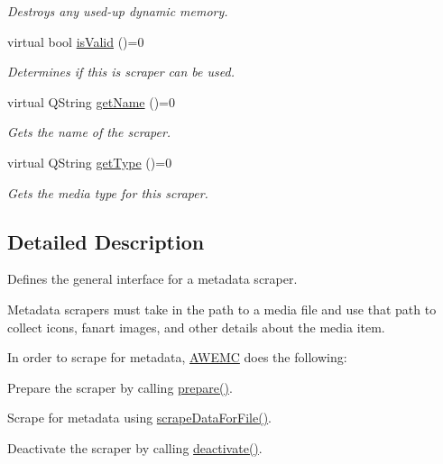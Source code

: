 \begin{DoxyCompactItemize}
\begin{DoxyCompactList}\small\item\em Destroys any used-\/up dynamic memory. \end{DoxyCompactList}\item 
virtual bool \hyperlink{class_a_w_e_1_1_metadata_scraper_a06f9da8e43ac52378ec15fc849e42eb8}{is\-Valid} ()=0
\begin{DoxyCompactList}\small\item\em Determines if this is scraper can be used. \end{DoxyCompactList}\item 
virtual Q\-String \hyperlink{class_a_w_e_1_1_metadata_scraper_ace0871b6861e04ec3ff39cba70606d29}{get\-Name} ()=0
\begin{DoxyCompactList}\small\item\em Gets the name of the scraper. \end{DoxyCompactList}\item 
virtual Q\-String \hyperlink{class_a_w_e_1_1_metadata_scraper_a71f1b614a3196d5d8b68e3d216896e3d}{get\-Type} ()=0
\begin{DoxyCompactList}\small\item\em Gets the media type for this scraper. \end{DoxyCompactList}\end{DoxyCompactItemize}


\subsection{Detailed Description}
Defines the general interface for a metadata scraper. 

Metadata scrapers must take in the path to a media file and use that path to collect icons, fanart images, and other details about the media item.

In order to scrape for metadata, \hyperlink{class_a_w_e_1_1_a_w_e_m_c}{A\-W\-E\-M\-C} does the following\-:
\begin{DoxyItemize}
\item Prepare the scraper by calling {\ttfamily \hyperlink{class_a_w_e_1_1_metadata_scraper_a92f9039770add633140b825bf41bc30a}{prepare()}}.
\item Scrape for metadata using {\ttfamily \hyperlink{class_a_w_e_1_1_metadata_scraper_a14f10736d12ada980b4c64a906ebe9a6}{scrape\-Data\-For\-File()}}.
\item Deactivate the scraper by calling {\ttfamily \hyperlink{class_a_w_e_1_1_metadata_scraper_a9a90e9974be775dff73c004ada209cb0}{deactivate()}}.
\end{DoxyItemize}


